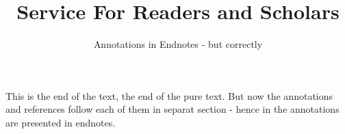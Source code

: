 \documentclass[
  DIV=calc,
  BCOR=5mm,
  11pt,
  smallheadings,
  oneside,
  abstract=true,
  toc=bib,
  ngerman,english]{scrartcl}
\begin{document}

\titlehead{fodina.csr.howto-: my Classical
Scholar Research framework}
\subject{Classical Scholar Texts With \textit{jurabib}}
\title{Service For Readers and Scholars}
\subtitle{Annotations in Endnotes - but correctly}

\maketitle






This is the end of the text, the end of the pure text. But now the annotations
and references follow each of them in separat section - hence in the annotations
are presented in endnotes.

\small



\printnomenclature

\theendnotes

\end{document}
